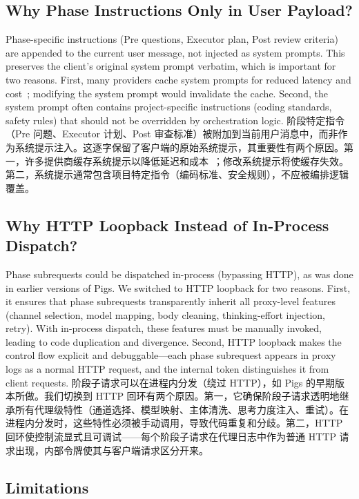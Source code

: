 \subsection{Why Phase Instructions Only in User Payload?}

Phase-specific instructions (Pre questions, Executor plan, Post review criteria) are appended to the current user message, not injected as system prompts. This preserves the client's original system prompt verbatim, which is important for two reasons. First, many providers cache system prompts for reduced latency and cost~\citep{anthropic_cache}; modifying the system prompt would invalidate the cache. Second, the system prompt often contains project-specific instructions (coding standards, safety rules) that should not be overridden by orchestration logic.
阶段特定指令（Pre 问题、Executor 计划、Post 审查标准）被附加到当前用户消息中，而非作为系统提示注入。这逐字保留了客户端的原始系统提示，其重要性有两个原因。第一，许多提供商缓存系统提示以降低延迟和成本~\citep{anthropic_cache}；修改系统提示将使缓存失效。第二，系统提示通常包含项目特定指令（编码标准、安全规则），不应被编排逻辑覆盖。

\subsection{Why HTTP Loopback Instead of In-Process Dispatch?}

Phase subrequests could be dispatched in-process (bypassing HTTP), as was done in earlier versions of Pigs. We switched to HTTP loopback for two reasons. First, it ensures that phase subrequests transparently inherit all proxy-level features (channel selection, model mapping, body cleaning, thinking-effort injection, retry). With in-process dispatch, these features must be manually invoked, leading to code duplication and divergence. Second, HTTP loopback makes the control flow explicit and debuggable---each phase subrequest appears in proxy logs as a normal HTTP request, and the internal token distinguishes it from client requests.
阶段子请求可以在进程内分发（绕过 HTTP），如 Pigs 的早期版本所做。我们切换到 HTTP 回环有两个原因。第一，它确保阶段子请求透明地继承所有代理级特性（通道选择、模型映射、主体清洗、思考力度注入、重试）。在进程内分发时，这些特性必须被手动调用，导致代码重复和分歧。第二，HTTP 回环使控制流显式且可调试——每个阶段子请求在代理日志中作为普通 HTTP 请求出现，内部令牌使其与客户端请求区分开来。

\subsection{Limitations}

